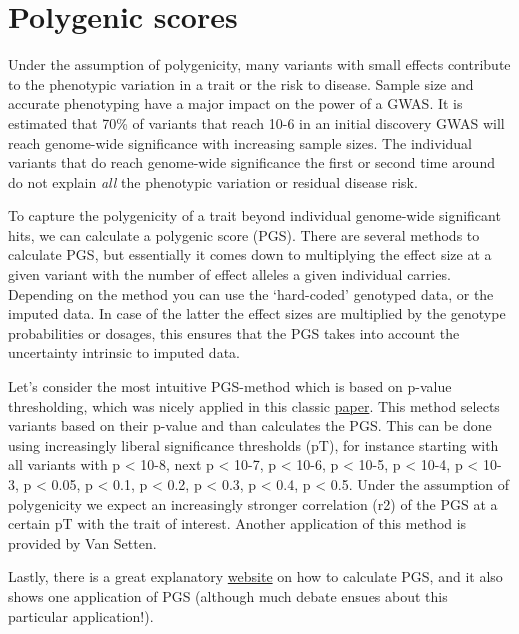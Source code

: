 \documentclass[
]{book}
\begin{document}
\hypertarget{polygenic-scores}{%
\section{Polygenic scores}\label{polygenic-scores}}

Under the assumption of polygenicity, many variants with small effects contribute to the phenotypic variation in a trait or the risk to disease. Sample size and accurate phenotyping have a major impact on the power of a GWAS. It is estimated that 70\% of variants that reach 10-6 in an initial discovery GWAS will reach genome-wide significance with increasing sample sizes. The individual variants that do reach genome-wide significance the first or second time around do not explain \emph{all} the phenotypic variation or residual disease risk.

To capture the polygenicity of a trait beyond individual genome-wide significant hits, we can calculate a polygenic score (PGS). There are several methods to calculate PGS, but essentially it comes down to multiplying the effect size at a given variant with the number of effect alleles a given individual carries.
Depending on the method you can use the `hard-coded' genotyped data, or the imputed data. In case of the latter the effect sizes are multiplied by the genotype probabilities or dosages, this ensures that the PGS takes into account the uncertainty intrinsic to imputed data.

Let's consider the most intuitive PGS-method which is based on p-value thresholding, which was nicely applied in this classic \href{https://doi.org/10.1038/nature08185}{paper}. This method selects variants based on their p-value and than calculates the PGS. This can be done using increasingly liberal significance thresholds (pT), for instance starting with all variants with p \textless{} 10-8, next p \textless{} 10-7, p \textless{} 10-6, p \textless{} 10-5, p \textless{} 10-4, p \textless{} 10-3, p \textless{} 0.05, p \textless{} 0.1, p \textless{} 0.2, p \textless{} 0.3, p \textless{} 0.4, p \textless{} 0.5. Under the assumption of polygenicity we expect an increasingly stronger correlation (r2) of the PGS at a certain pT with the trait of interest. Another application of this method is provided by Van Setten\citep{vansetten2015}.

Lastly, there is a great explanatory \href{http://polygenicscores.org/explained/}{website} on how to calculate PGS, and it also shows one application of PGS (although much debate ensues about this particular application!).
\end{document}
